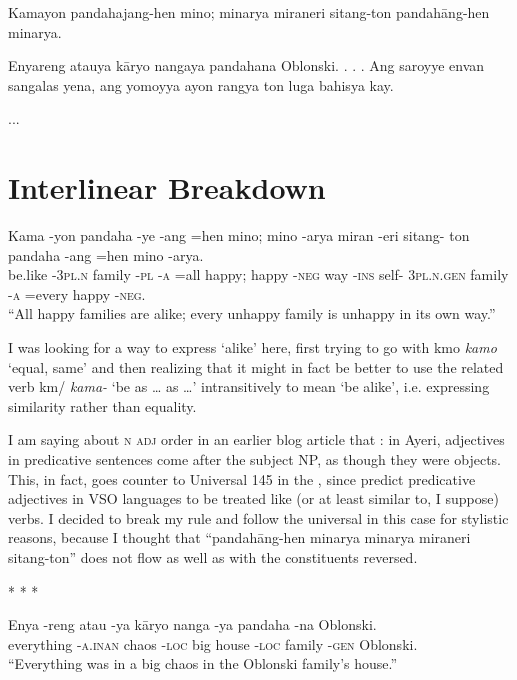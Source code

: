 \documentclass[12pt,paper=letter]{scrartcl}
\newcommand{\fw}[1]{\textit{#1}} %
\newcommand{\q}[1]{\enquote{#1}} %
\newcommand{\qq}[1]{\enquote*{#1}} %
\newcommand{\divider}{\vspace{0.5\baselineskip} \centerline{* * *} \vspace{0.5\baselineskip}}
\newcommand{\mor}[1]{\textsc{\lowercase{#1}}}
\newcommand{\ayr}[1]{{\Tagati #1}}
\begin{document}
\noindent Kamayon pandahajang-hen mino; minarya miraneri sitang-ton 
pandahāng-hen minarya.

Enyareng atauya kāryo nangaya pandahana Oblonski. . . . Ang saroyye envan 
sangalas yena, ang yomoyya ayon rangya ton luga bahisya kay.

...

\section{Interlinear Breakdown}

\begin{exe}
    \ex \label{ex:1}
    \gll Kama -yon pandaha -ye -ang =hen mino; mino -arya miran -eri sitang- ton 
	pandaha -ang =hen mino -arya. \\
    be.like \mor{-3PL.N} family \mor{-PL} \mor{-A} =all happy; happy \mor{-NEG} 
	way \mor{-INS} self- \mor{3PL.N.GEN} family \mor{-A} =every happy
	\mor{-NEG}. \\
    \glt \enquote{All happy families are alike; every unhappy family is unhappy 
	in its own way.}
\end{exe}

I was looking for a way to express \qq{alike} here, first trying to go with
\ayr{kmo} \fw{kamo} \qq{equal, same} and then realizing that it might in fact
be better to use the related verb \ayr{km/} \fw{kama-} \qq{be as … as …}
intransitively to mean \qq{be alike}, i.e. expressing similarity rather than 
equality.

I am saying about \mor{N ADJ} order in an earlier blog article that 
: in Ayeri, adjectives in predicative sentences come after
the subject NP, as though they were objects. This, in fact, goes counter to 
Universal 145 in the  \autocite{universalsarchive},
since \citeauthor{universalsarchive} predict predicative adjectives in VSO 
languages to be treated like (or at least similar to, I suppose) verbs. I 
decided to break my rule and follow the universal in this case for stylistic 
reasons, because I thought that \q{pandahāng-hen minarya minarya miraneri 
sitang-ton} does not flow as well as with the constituents reversed.

\divider

\begin{exe}
    \ex
    \gll Enya -reng atau -ya kāryo nanga -ya pandaha -na Oblonski. \\
    everything \mor{-A.INAN} chaos \mor{-LOC} big house \mor{-LOC} family 
	\mor{-GEN} Oblonski. \\
    \glt \enquote{Everything was in a big chaos in the Oblonski family's house.}
\end{exe}
\end{document}
